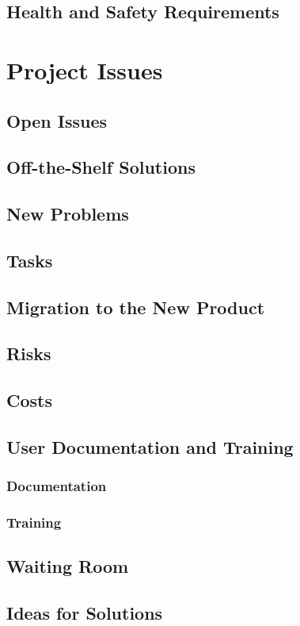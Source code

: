 \documentclass{article}
\begin{document}
\subsection{Health and Safety Requirements}

\section{Project Issues}
\subsection{Open Issues}
\subsection{Off-the-Shelf Solutions}
\subsection{New Problems}
\subsection{Tasks}
\subsection{Migration to the New Product}
\subsection{Risks}
\subsection{Costs}
\subsection{User Documentation and Training}
\subsubsection{Documentation}
\subsubsection{Training}
\subsection{Waiting Room}
\subsection{Ideas for Solutions}
\end{document}

